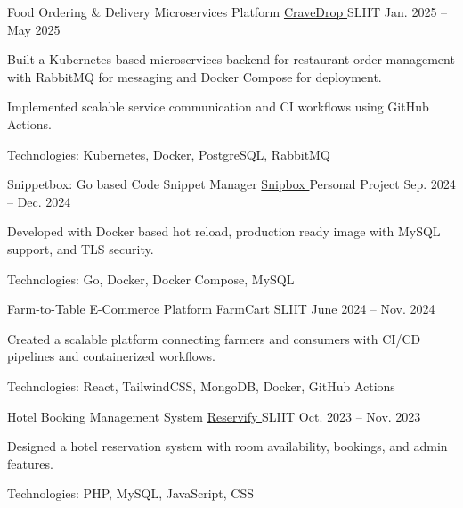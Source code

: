 
\begin{cventries}

  \cventry
    {Food Ordering & Delivery Microservices Platform}
    {\href{https://github.com/nmdra/CraveDrop}{CraveDrop \faGithub}}
    {SLIIT}
    {Jan. 2025 -- May 2025}
    {
      \begin{cvitems}
        \item {Built a Kubernetes based microservices backend for restaurant order management with RabbitMQ for messaging and Docker Compose for deployment.}
        \item {Implemented scalable service communication and CI workflows using GitHub Actions.}
        \item {Technologies: Kubernetes, Docker, PostgreSQL, RabbitMQ}
      \end{cvitems}
    }

  \cventry
    {Snippetbox: Go based Code Snippet Manager}
    {\href{https://github.com/nmdra/snipbox}{Snipbox \faGithub}}
    {Personal Project}
    {Sep. 2024 -- Dec. 2024}
    {
      \begin{cvitems}
        \item {Developed with Docker based hot reload, production ready image with MySQL support, and TLS security.}
        \item {Technologies: Go, Docker, Docker Compose, MySQL}
      \end{cvitems}
    }

  \cventry
    {Farm-to-Table E-Commerce Platform}
    {\href{https://github.com/nmdra/FarmCart}{FarmCart \faGithub}}
    {SLIIT}
    {June 2024 -- Nov. 2024}
    {
      \begin{cvitems}
        \item {Created a scalable platform connecting farmers and consumers with CI/CD pipelines and containerized workflows.}
        \item {Technologies: React, TailwindCSS, MongoDB, Docker, GitHub Actions}
      \end{cvitems}
    }

  \cventry
    {Hotel Booking Management System}
    {\href{https://github.com/nmdra/Reservify/}{Reservify \faGithub}}
    {SLIIT}
    {Oct. 2023 -- Nov. 2023}
    {
      \begin{cvitems}
        \item {Designed a hotel reservation system with room availability, bookings, and admin features.}
        \item {Technologies: PHP, MySQL, JavaScript, CSS}
      \end{cvitems}
    }


\end{cventries}
